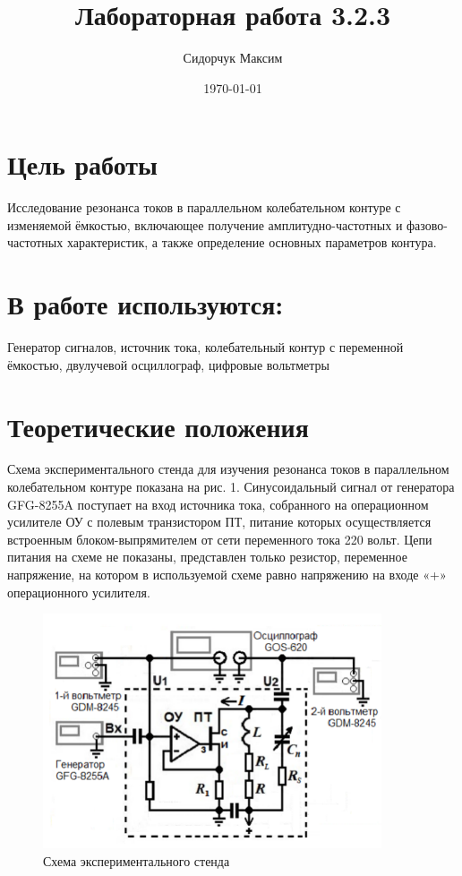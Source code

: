 \documentclass[a4paper]{article}
\date{\today}
\title{Лабораторная работа 3.2.3}
\author{Сидорчук Максим}
\begin{document}
\maketitle

\section{Цель работы}

Исследование резонанса токов в параллельном колебательном контуре с изменяемой ёмкостью, включающее получение амплитудно-частотных и фазово-частотных характеристик, а также определение основных параметров контура.

\section{В работе используются:}
Генератор сигналов, источник тока, колебательный контур с переменной ёмкостью, двулучевой осциллограф, цифровые вольтметры


\section{Теоретические положения}

Схема экспериментального стенда для изучения резонанса токов в параллельном колебательном контуре показана на рис. 1. Синусоидальный сигнал от генератора GFG-8255A поступает на вход источника тока, собранного на операционном усилителе ОУ с полевым транзистором ПТ, питание которых осуществляется встроенным блоком-выпрямителем от сети переменного тока 220 вольт. Цепи питания на схеме не показаны, представлен только резистор, переменное напряжение, на котором в используемой схеме равно напряжению на входе «+» операционного усилителя. \\

\begin{figure}[H]
    \centering
    \includegraphics[width=10cm]{fig1.png}
    \caption{Схема экспериментального стенда}
    \label{fig:vac}
\end{figure}
\end{document}
